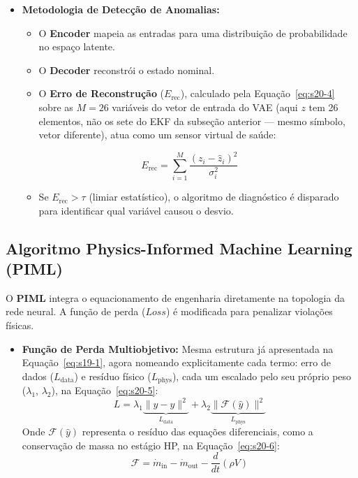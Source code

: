 \documentclass[12pt,a4paper]{article}
\numberwithin{equation}{section}
\numberwithin{table}{section}
\numberwithin{figure}{section}
\begin{document}
{	\begin{itemize}
		\item \textbf{Metodologia de Detecção de Anomalias:}
		\begin{itemize}
			\item O \textbf{Encoder} mapeia as entradas para uma distribuição de probabilidade no espaço latente.
			\item O \textbf{Decoder} reconstrói o estado nominal.
			\item O \textbf{Erro de Reconstrução} ($E_{\text{rec}}$), calculado pela Equação~\eqref{eq:s20-4} sobre as $M=26$ variáveis do vetor de entrada do VAE (aqui $z$ tem 26 elementos, não os sete do EKF da subseção anterior — mesmo símbolo, vetor diferente), atua como um sensor virtual de saúde:
		\end{itemize}
		\begin{equation}\label{eq:s20-4}
 E_{\text{rec}} = \sum_{i=1}^{M} \frac{(z_i - \hat{z}_i)^2}{\sigma_i^2} 
\end{equation}
		\begin{itemize}
			\item Se $E_{\text{rec}} > \tau$ (limiar estatístico), o algoritmo de diagnóstico é disparado para identificar qual variável causou o desvio.
		\end{itemize}
	\end{itemize}
	
	\subsection{Algoritmo Physics-Informed Machine Learning (PIML)}
	
	O \textbf{PIML} integra o equacionamento de engenharia diretamente na topologia da rede neural. A função de perda ($Loss$) é modificada para penalizar violações físicas.
	
	\begin{itemize}
		\item \textbf{Função de Perda Multiobjetivo:} Mesma estrutura já apresentada na Equação~\eqref{eq:s19-1}, agora nomeando explicitamente cada termo: erro de dados ($L_{\text{data}}$) e resíduo físico ($L_{\text{phys}}$), cada um escalado pelo seu próprio peso ($\lambda_1$, $\lambda_2$), na Equação~\eqref{eq:s20-5}:
		\begin{equation}\label{eq:s20-5}
 L = \lambda_1 \underbrace{\| y - \hat{y} \|^2}_{L_{\text{data}}} + \lambda_2 \underbrace{\| \mathcal{F}(\hat{y}) \|^2}_{L_{\text{phys}}}
\end{equation}
		Onde $\mathcal{F}(\hat{y})$ representa o resíduo das equações diferenciais, como a conservação de massa no estágio HP, na Equação~\eqref{eq:s20-6}:
		\begin{equation}\label{eq:s20-6}
 \mathcal{F} = \dot{m}_{\text{in}} - \dot{m}_{\text{out}} - \frac{d}{dt} (\rho V) 
\end{equation}
	\end{itemize}
	
}
\end{document}

